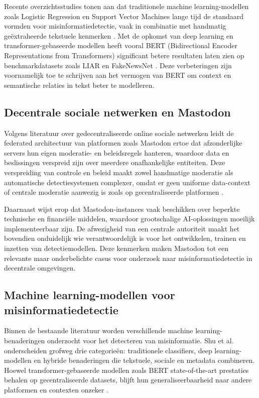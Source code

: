 Recente overzichtsstudies tonen aan dat traditionele machine learning-modellen
zoals Logistic Regression en Support Vector Machines
lange tijd de standaard vormden voor misinformatiedetectie,
vaak in combinatie met handmatig geëxtraheerde tekstuele kenmerken \autocite{Shu2017}.
Met de opkomst van deep learning en transformer-gebaseerde modellen
heeft vooral BERT (Bidirectional Encoder Representations from Transformers)
significant betere resultaten laten zien op benchmarkdatasets zoals LIAR en FakeNewsNet \autocite{Devlin2019}.
Deze verbeteringen zijn voornamelijk toe te schrijven aan het vermogen van BERT
om context en semantische relaties in tekst beter te modelleren.

\subsection{Decentrale sociale netwerken en Mastodon}
\label{sec:decentraal_mastodon}

Volgens literatuur over gedecentraliseerde online sociale netwerken leidt de federated architectuur 
van platformen zoals Mastodon ertoe dat afzonderlijke servers hun eigen moderatie- en beleidsregels hanteren, 
waardoor data en beslissingen verspreid zijn over meerdere onafhankelijke entiteiten. 
Deze verspreiding van controle en beleid maakt zowel handmatige moderatie als automatische detectiesystemen complexer, 
omdat er geen uniforme data-context of centrale moderatie aanwezig is 
zoals op gecentraliseerde platformen \autocite{Fediverse2025,TechPolicy2025}.

Daarnaast wijst \textcite{SuryaCreatX2023} erop dat Mastodon-instances
vaak beschikken over beperkte technische en financiële middelen,
waardoor grootschalige AI-oplossingen moeilijk implementeerbaar zijn.
De afwezigheid van een centrale autoriteit maakt het bovendien onduidelijk
wie verantwoordelijk is voor het ontwikkelen, trainen en inzetten van detectiemodellen.
Deze kenmerken maken Mastodon tot een relevante maar onderbelichte casus
voor onderzoek naar misinformatiedetectie in decentrale omgevingen.

\subsection{Machine learning-modellen voor misinformatiedetectie}
\label{sec:ml_modellen}

Binnen de bestaande literatuur worden verschillende machine learning-benaderingen onderzocht
voor het detecteren van misinformatie.
Shu et al.\ \autocite{Shu2017} onderscheiden grofweg drie categorieën:
traditionele classifiers, deep learning-modellen en hybride benaderingen
die tekstuele, sociale en metadata combineren.
Hoewel transformer-gebaseerde modellen zoals BERT
state-of-the-art prestaties behalen op gecentraliseerde datasets,
blijft hun generaliseerbaarheid naar andere platformen en contexten onzeker \autocite{Devlin2019}.

